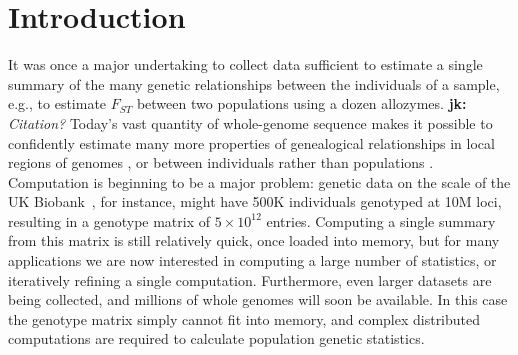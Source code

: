 \documentclass{article}
\newcommand{\jk}[1]{{\color{red}\textbf{jk:} \it #1}}
\begin{document}
%
%
%
%
%
%
%
%
%



\section*{Introduction}

It was once a major undertaking to collect data sufficient to estimate a single summary
of the many genetic relationships between the individuals of a sample,
e.g., to estimate $F_{ST}$ between two populations using a dozen allozymes.
\jk{Citation?}
Today's vast quantity of whole-genome sequence
makes it possible to confidently estimate many more properties of genealogical relationships
in local regions of genomes \citep[e.g,][]{booker2018understanding,haenel2018metaanalysis,stankowski2019widespread},
or between individuals rather than populations \citep[e.g.,][]{browning2010highresolution,speed2014relatedness,aguillon2017deconstructing}.
Computation is beginning to be a major problem:
genetic data on the scale of the UK Biobank~\citep{bycroft2018genome},
for instance, might have 500K individuals genotyped at 10M loci,
resulting in a genotype matrix of $5 \times 10^{12}$ entries.
Computing a single summary from this matrix is still relatively quick,
once loaded into memory,
but for many applications we are now interested in computing a large number of statistics,
or iteratively refining a single computation.
Furthermore, even larger datasets are being collected,
and millions of whole genomes will soon be available. In this case the
genotype matrix simply cannot fit into memory, and complex distributed
computations are required to calculate population genetic statistics.
\end{document}
